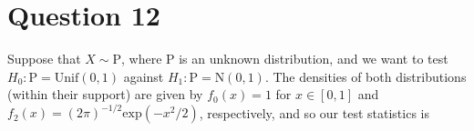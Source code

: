 \documentclass[10pt]{article}
\begin{document}
\section{Question 12} \noindent
Suppose that \(X \sim \mathrm{P}\), where \(\mathrm{P}\) is an unknown distribution, and we want to test \(H_0: \mathrm{P} = \mathrm{Unif}(0,1)\) against 
\(H_1: \mathrm{P} = \mathrm{N}(0, 1)\). The densities of both distributions (within their support) are given by \(f_0(x) = 1\) for \(x \in [0,1]\) and 
\(f_2(x) = (2\pi)^{-1/2}\mathrm{exp}(-x^2 / 2)\), respectively, and so our test statistics is 


\end{document}
